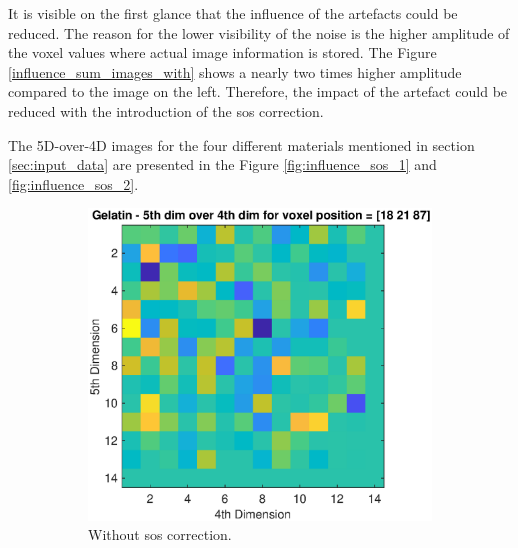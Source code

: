 It is visible on the first glance that the influence of the artefacts could be reduced. The reason for the lower visibility of the noise is the higher amplitude of the voxel values where actual image information is stored. The Figure \ref{influence_sum_images_with} shows a nearly two times higher amplitude compared to the image on the left. Therefore, the impact of the artefact could be reduced with the introduction of the \ac{sos} correction.

\bigskip

The 5D-over-4D images for the four different materials mentioned in section \ref{sec:input_data} are presented in the Figure \ref{fig:influence_sos_1} and \ref{fig:influence_sos_2}.
\begin{figure}[H]
     \centering
     \begin{subfigure}[b]{0.47\textwidth}
         \centering
         \includegraphics[width=1.02\linewidth,left]{Graphics/Results/14_vecs_sos_vs_noSos/5thdim_over4D_no_sos_pulp.eps}
         \caption{Without \ac{sos} correction. }
         \label{leer}
     \end{subfigure}
     \hfill
     \begin{subfigure}[b]{0.47\textwidth}
         \centering

\end{subfigure}
\end{figure}

